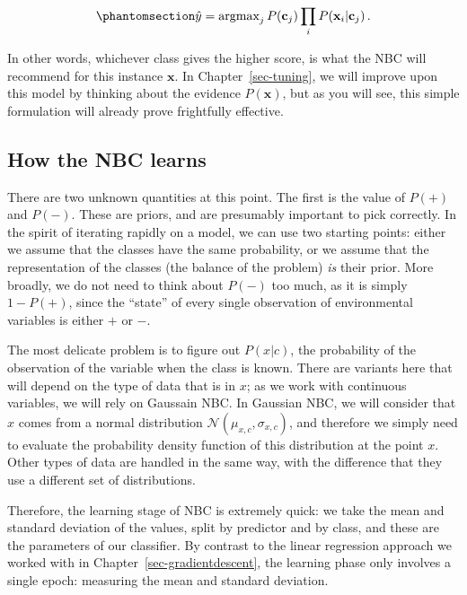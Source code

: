 \documentclass[
  letterpaper,
]{scrbook}
\begin{document}
\begin{equation}\phantomsection\label{eq-nbc-decision}{
\hat y = \text{argmax}_j \, P(\mathbf{c}_j)\prod_i P(\mathbf{x}_i|\mathbf{c}_j) \,.
}\end{equation}

In other words, whichever class gives the higher score, is what the NBC
will recommend for this instance \(\mathbf{x}\). In
Chapter~\ref{sec-tuning}, we will improve upon this model by thinking
about the evidence \(P(\mathbf{x})\), but as you will see, this simple
formulation will already prove frightfully effective.

\subsection{How the NBC learns}\label{how-the-nbc-learns}

There are two unknown quantities at this point. The first is the value
of \(P(+)\) and \(P(-)\). These are priors, and are presumably important
to pick correctly. In the spirit of iterating rapidly on a model, we can
use two starting points: either we assume that the classes have the same
probability, or we assume that the representation of the classes (the
balance of the problem) \emph{is} their prior. More broadly, we do not
need to think about \(P(-)\) too much, as it is simply \(1-P(+)\), since
the ``state'' of every single observation of environmental variables is
either \(+\) or \(-\).

The most delicate problem is to figure out \(P(x|c)\), the probability
of the observation of the variable when the class is known. There are
variants here that will depend on the type of data that is in \(x\); as
we work with continuous variables, we will rely on Gaussain NBC. In
Gaussian NBC, we will consider that \(x\) comes from a normal
distribution \(\mathcal{N}(\mu_{x,c},\sigma_{x,c})\), and therefore we
simply need to evaluate the probability density function of this
distribution at the point \(x\). Other types of data are handled in the
same way, with the difference that they use a different set of
distributions.

Therefore, the learning stage of NBC is extremely quick: we take the
mean and standard deviation of the values, split by predictor and by
class, and these are the parameters of our classifier. By contrast to
the linear regression approach we worked with in
Chapter~\ref{sec-gradientdescent}, the learning phase only involves a
single epoch: measuring the mean and standard deviation.
\end{document}
